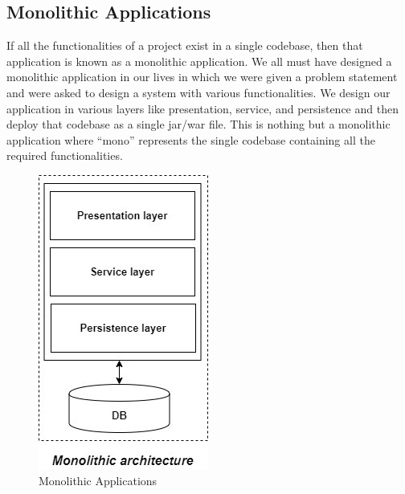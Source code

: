 \subsection{Monolithic Applications}

If all the functionalities of a project exist in a single codebase, then that application is known as a monolithic application. We all must have designed a monolithic application in our lives in which we were given a problem statement and were asked to design a system with various functionalities. We design our application in various layers like presentation, service, and persistence and then deploy that codebase as a single jar/war file. This is nothing but a monolithic application where “mono” represents the single codebase containing all the required functionalities.
\begin{figure}[!ht]
      \center
      \includegraphics[scale=0.60]{assets/monolithic.jpg}
      \caption{Monolithic Applications}
      \label{fig:monoapp}
\end{figure}

